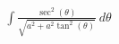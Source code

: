 \documentclass[preview]{standalone}
\begin{document}
\begin{align*}
\int \frac{\sec^2(\theta)}{\sqrt{a^2+a^2 \tan^2(\theta)}} \ d\theta
\end{align*}
\end{document}
